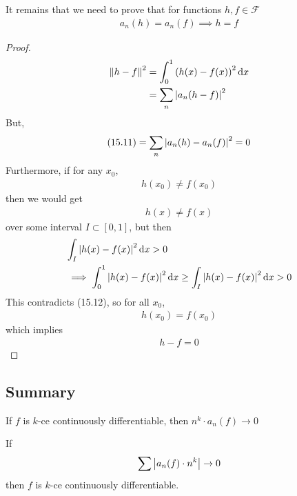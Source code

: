 \begin{lemma}
    It remains that we need to prove that for functions $h, f \in \mathcal{F}$
    \begin{align}
        a_n(h) = a_n(f) \implies h = f
    \end{align}
\end{lemma}
\begin{proof}
    \begin{align}
        \norm{h-f}^2 &= \int_0^1 \left(h(x) - f(x)\right)^2 \dd{x}\\
        &= \sum_n \abs{a_n(h-f)}^2
    \end{align}
    But,
    \begin{align}
        (15.11) = \sum_n \abs{a_n(h)-a_n(f)}^2 = 0
    \end{align}
    Furthermore, if for any $x_0$,
    \begin{align}
        h(x_0) \ne f(x_0)
    \end{align}
    then we would get
    \begin{align}
        h(x) \ne f(x)
    \end{align}
    over some interval $I \subset [0,1]$, but then
    \begin{align}
        &\int_I \abs{h(x) - f(x)}^2 \dd{x} > 0\\
        &\implies \int_0^1 \abs{h(x) - f(x)}^2 \dd{x} \ge \int_I \abs{h(x) - f(x)}^2 \dd{x} > 0
    \end{align}
    This contradicts (15.12), so for all $x_0$,
    \begin{align}
        h(x_0) = f(x_0)
    \end{align}
    which implies
    \begin{align}
        h - f = 0
    \end{align}
\end{proof}
\subsection{Summary}
\begin{lemma}
    If $f$ is $k$-ce continuously differentiable, then $n^k \cdot a_n(f) \to 0$
\end{lemma}
\begin{lemma}
    If
    \begin{align}
        \sum \abs{a_n(f) \cdot n^k} \to 0
    \end{align}
    then $f$ is $k$-ce continuously differentiable.
\end{lemma}
